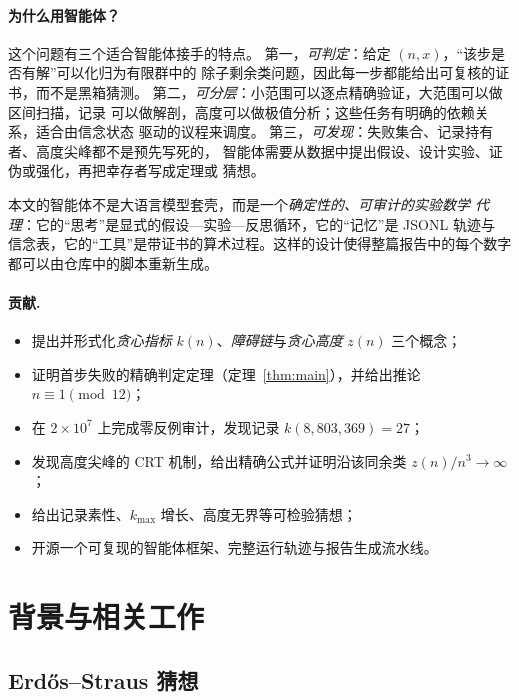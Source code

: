 \documentclass[11pt,a4paper]{ctexart}
\theoremstyle{definition}
\theoremstyle{remark}
\begin{document}
\paragraph{为什么用智能体？}
这个问题有三个适合智能体接手的特点。
第一，\emph{可判定}：给定 $(n,x)$，“该步是否有解”可以化归为有限群中的
除子剩余类问题，因此每一步都能给出可复核的证书，而不是黑箱猜测。
第二，\emph{可分层}：小范围可以逐点精确验证，大范围可以做区间扫描，记录
可以做解剖，高度可以做极值分析；这些任务有明确的依赖关系，适合由信念状态
驱动的议程来调度。
第三，\emph{可发现}：失败集合、记录持有者、高度尖峰都不是预先写死的，
智能体需要从数据中提出假设、设计实验、证伪或强化，再把幸存者写成定理或
猜想。

本文的智能体不是大语言模型套壳，而是一个\emph{确定性的、可审计的实验数学
代理}：它的“思考”是显式的假设—实验—反思循环，它的“记忆”是 JSONL 轨迹与
信念表，它的“工具”是带证书的算术过程。这样的设计使得整篇报告中的每个数字
都可以由仓库中的脚本重新生成。

\paragraph{贡献.}
\begin{itemize}
\item 提出并形式化\emph{贪心指标} $k(n)$、\emph{障碍链}与\emph{贪心高度}
$z(n)$ 三个概念；
\item 证明首步失败的精确判定定理（定理~\ref{thm:main}），并给出推论
$n\equiv1\pmod{12}$；
\item 在 $2\times10^7$ 上完成零反例审计，发现记录
$k(8{,}803{,}369)=27$；
\item 发现高度尖峰的 CRT 机制，给出精确公式并证明沿该同余类
$z(n)/n^3\to\infty$；
\item 给出记录素性、$k_{\max}$ 增长、高度无界等可检验猜想；
\item 开源一个可复现的智能体框架、完整运行轨迹与报告生成流水线。
\end{itemize}

\section{背景与相关工作}

\subsection{Erdős--Straus 猜想}
\end{document}
